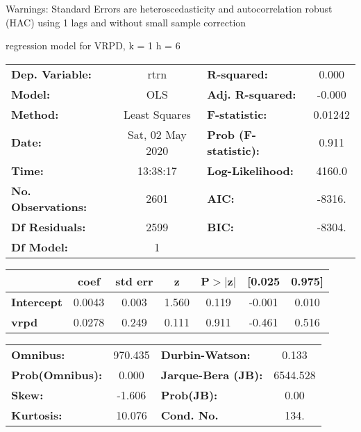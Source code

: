 Warnings: \newline
 [1] Standard Errors are heteroscedasticity and autocorrelation robust (HAC) using 1 lags and without small sample correction\ 

regression model for VRPD, k = 1 h = 6\begin{center}
\begin{tabular}{lclc}
\toprule
\textbf{Dep. Variable:}    &       rtrn       & \textbf{  R-squared:         } &     0.000   \\
\textbf{Model:}            &       OLS        & \textbf{  Adj. R-squared:    } &    -0.000   \\
\textbf{Method:}           &  Least Squares   & \textbf{  F-statistic:       } &   0.01242   \\
\textbf{Date:}             & Sat, 02 May 2020 & \textbf{  Prob (F-statistic):} &    0.911    \\
\textbf{Time:}             &     13:38:17     & \textbf{  Log-Likelihood:    } &    4160.0   \\
\textbf{No. Observations:} &        2601      & \textbf{  AIC:               } &    -8316.   \\
\textbf{Df Residuals:}     &        2599      & \textbf{  BIC:               } &    -8304.   \\
\textbf{Df Model:}         &           1      & \textbf{                     } &             \\
\bottomrule
\end{tabular}
\begin{tabular}{lcccccc}
                   & \textbf{coef} & \textbf{std err} & \textbf{z} & \textbf{P$> |$z$|$} & \textbf{[0.025} & \textbf{0.975]}  \\
\midrule
\textbf{Intercept} &       0.0043  &        0.003     &     1.560  &         0.119        &       -0.001    &        0.010     \\
\textbf{vrpd}      &       0.0278  &        0.249     &     0.111  &         0.911        &       -0.461    &        0.516     \\
\bottomrule
\end{tabular}
\begin{tabular}{lclc}
\textbf{Omnibus:}       & 970.435 & \textbf{  Durbin-Watson:     } &    0.133  \\
\textbf{Prob(Omnibus):} &   0.000 & \textbf{  Jarque-Bera (JB):  } & 6544.528  \\
\textbf{Skew:}          &  -1.606 & \textbf{  Prob(JB):          } &     0.00  \\
\textbf{Kurtosis:}      &  10.076 & \textbf{  Cond. No.          } &     134.  \\
\bottomrule
\end{tabular}
\end{center}

